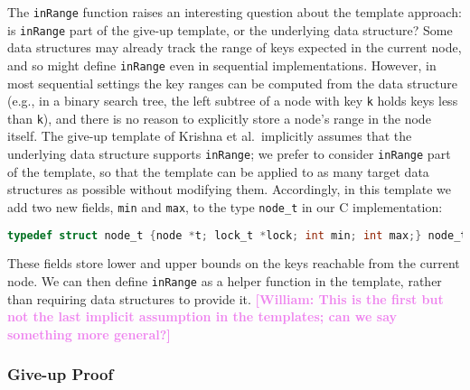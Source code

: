 \documentclass[a4paper,UKenglish,cleveref, autoref, thm-restate]{lipics-v2021}
\newcommand{\wm}[1]{\textbf{\textcolor{violet}{[William: #1]}}}
\begin{document}
The \lstinline{inRange} function raises an interesting question about the template approach: is \lstinline{inRange} part of the give-up template, or the underlying data structure? Some data structures may already track the range of keys expected in the current node, and so might define \lstinline{inRange} even in sequential implementations. However, in most sequential settings the key ranges can be computed from the data structure (e.g., in a binary search tree, the left subtree of a node with key \lstinline{k} holds keys less than \lstinline{k}), and there is no reason to explicitly store a node's range in the node itself. The give-up template of Krishna et al.~implicitly assumes that the underlying data structure supports \lstinline{inRange}; we prefer to consider \lstinline{inRange} part of the template, so that the template can be applied to as many target data structures as possible without modifying them. Accordingly, in this template we add two new fields, \lstinline{min} and \lstinline{max}, to the type \lstinline{node_t} in our C implementation:
\begin{lstlisting}[language = C, backgroundcolor=\color{white}, basicstyle=\ttfamily\footnotesize]
	typedef struct node_t {node *t; lock_t *lock; int min; int max;} node_t;
\end{lstlisting}
These fields store lower and upper bounds on the keys reachable from the current node. %
We can then define \lstinline{inRange} as a helper function in the template, rather than requiring data structures to provide it. \wm{This is the first but not the last implicit assumption in the templates; can we say something more general?}

\subsubsection{Give-up Proof}
\label{traverse_proof_giveup}
\end{document}
